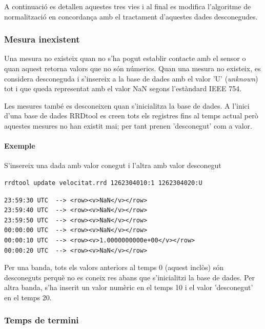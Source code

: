 A continuació es detallen aquestes tres vies i al final es modifica l'algoritme de normalització en concordança amb el tractament d'aquestes dades desconegudes.

\subsubsection{Mesura inexistent}

Una mesura no existeix quan no s'ha pogut establir contacte amb el sensor o quan aquest retorna valors que no són númerics. Quan una mesura no existeix, es considera desconeguda i s'insereix a la base de dades amb el valor 'U' (\emph{unknown}) tot i que queda representat amb el valor NaN segons l'estàndard IEEE 754. 


Les mesures també es desconeixen quan s'inicialitza la base de dades. A l'inici d'una base de dades RRDtool es creen tots els registres fins al temps actual però aquestes mesures no han existit mai; per tant prenen 'desconegut' com a valor.


\paragraph{Exemple} S'insereix una dada amb valor conegut i l'altra amb valor desconegut

\begin{lstlisting}[style=sh]
rrdtool update velocitat.rrd 1262304010:1 1262304020:U 
\end{lstlisting}

\begin{lstlisting}
23:59:30 UTC  --> <row><v>NaN</v></row>
23:59:40 UTC  --> <row><v>NaN</v></row>
23:59:50 UTC  --> <row><v>NaN</v></row>
00:00:00 UTC  --> <row><v>NaN</v></row>
00:00:10 UTC  --> <row><v>1.0000000000e+00</v></row>
00:00:20 UTC  --> <row><v>NaN</v></row>
\end{lstlisting}

Per una banda, tots els valors anteriors al temps 0 (aquest inclòs) són desconeguts perquè no es coneix res abans que s'inicialitzi la base de dades. Per altra banda, s'ha inserit un valor numèric en el temps 10 i el valor 'desconegut' en el temps 20.



\subsubsection{Temps de termini}
\label{sec:rrdtool-etapes:termini}

